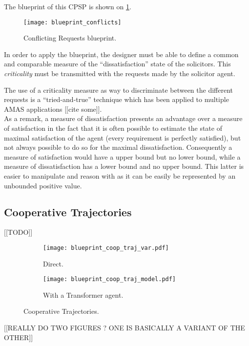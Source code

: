The blueprint of this CPSP is shown on \figurename{} \ref{blueprint_conflicts}.

\begin{figure}
\centering
\texttt{[image: blueprint\_conflicts]}
\caption{Conflicting Requests blueprint.}\label{blueprint_conflicts}
\end{figure}

In order to apply the blueprint, the designer must be able to define a common and comparable measure of the \enquote{dissatisfaction} state of the solicitors. This \emph{criticality} must be transmitted with the requests made by the solicitor agent.

The use of a criticality measure as way to discriminate between the different requests is a \enquote{tried-and-true} technique which has been applied to multiple AMAS applications [[cite some]].\\
As a remark, a measure of dissatisfaction presents an advantage over a measure of satisfaction in the fact that it is often possible to estimate the state of maximal satisfaction of the agent (every requirement is perfectly satisfied), but not always possible to do so for the maximal dissatisfaction. Consequently a measure of satisfaction would have a upper bound but no lower bound, while a measure of dissatisfaction has a lower bound and no upper bound. This latter is easier to manipulate and reason with as it can be easily be represented by an unbounded positive value.

\subsection{Cooperative Trajectories}

[[TODO]]

\begin{figure}
\centering
	\begin{subfigure}{0.49\textwidth}
		\centering
		\texttt{[image: blueprint\_coop\_traj\_var.pdf]}
		\caption{Direct.}
	\end{subfigure}
	\begin{subfigure}{0.49\textwidth}
		\centering
		\texttt{[image: blueprint\_coop\_traj\_model.pdf]}
		\caption{With a Transformer agent.}
	\end{subfigure}
\caption{Cooperative Trajectories.}\label{blueprint_coop_traj}
\end{figure}

[[REALLY DO TWO FIGURES ? ONE IS BASICALLY A VARIANT OF THE OTHER]]

